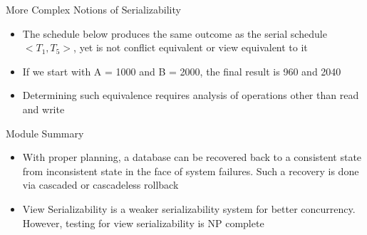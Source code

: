 \documentclass[aspectratio=169, xcolor=dvipsnames]{beamer}
\begin{document}
\begin{frame}{More Complex Notions of Serializability}
    \begin{itemize}[<+->]
        \item The schedule below produces the same outcome as the serial schedule $< T_1, T_5 >$, yet is not conflict equivalent or view equivalent to it
        \item If we start with A = 1000 and B = 2000, the final result is 960 and 2040
        \item Determining such equivalence requires analysis of operations other than read and write
    \end{itemize}
\end{frame}

\begin{frame}{Module Summary}
    \begin{itemize}[<+->]
        \item With proper planning, a database can be recovered back to a consistent state from inconsistent state in the face of system failures. Such a recovery is done via cascaded or cascadeless rollback
        \item View Serializability is a weaker serializability system for better concurrency. However, testing for view serializability is NP complete
    \end{itemize}
    \vspace{2em}
\end{frame}
\end{document}
